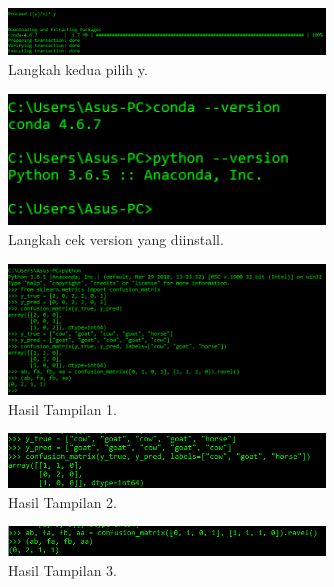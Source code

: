 \begin{figure}[ht]\centerline{\includegraphics[width=0.75\textwidth]{figures/a8.PNG}}\caption{Langkah kedua pilih y.}\end{figure}
\begin{figure}[ht]\centerline{\includegraphics[width=0.75\textwidth]{figures/a9.PNG}}\caption{Langkah cek version yang diinstall.}\end{figure}
\begin{figure}[ht]\centerline{\includegraphics[width=0.75\textwidth]{figures/a10.PNG}}\caption{Hasil Tampilan 1.}\end{figure}
\begin{figure}[ht]\centerline{\includegraphics[width=0.75\textwidth]{figures/a11.PNG}}\caption{Hasil Tampilan 2.}\end{figure}
\begin{figure}[ht]\centerline{\includegraphics[width=0.75\textwidth]{figures/a12.PNG}}\caption{Hasil Tampilan 3.}\end{figure}




